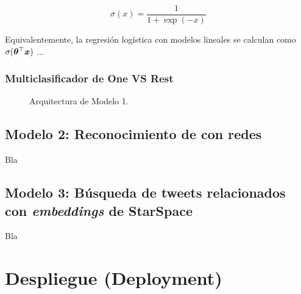 \begin{equation} \label{eq:logits-formula}
  \sigma(x) = \frac{1} {1 + \exp(-x)}
\end{equation}

Equivalentemente, la regresión logística con modelos lineales se calculan como $\sigma({\bm{\theta}}^{\top} {\bm{x}})$ ...

\subsubsection{Multiclasificador de One VS Rest}
\begin{figure}[H]
  \centering
\decoRule
\caption[Arquitectura de Modelo 1]{Arquitectura de Modelo 1.}
\label{fig:model1-arch}
\end{figure}


\subsection{Modelo 2: Reconocimiento de  con redes }
 Bla

\subsection{Modelo 3: Búsqueda de tweets relacionados con \emph{embeddings} de \mbox{StarSpace}}
 Bla


\section{Despliegue (Deployment)}
